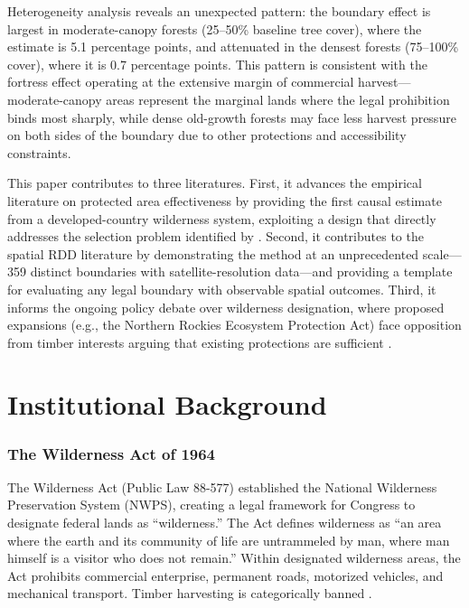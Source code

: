 \documentclass[12pt]{article}
\begin{document}
Heterogeneity analysis reveals an unexpected pattern: the boundary effect is largest in moderate-canopy forests (25--50\% baseline tree cover), where the estimate is 5.1 percentage points, and attenuated in the densest forests (75--100\% cover), where it is 0.7 percentage points. This pattern is consistent with the fortress effect operating at the extensive margin of commercial harvest---moderate-canopy areas represent the marginal lands where the legal prohibition binds most sharply, while dense old-growth forests may face less harvest pressure on both sides of the boundary due to other protections and accessibility constraints.

This paper contributes to three literatures. First, it advances the empirical literature on protected area effectiveness by providing the first causal estimate from a developed-country wilderness system, exploiting a design that directly addresses the selection problem identified by \citet{JoppaAndPfaff2009}. Second, it contributes to the spatial RDD literature \citep{KeeleAndTitiunik2015, Dell2010} by demonstrating the method at an unprecedented scale---359 distinct boundaries with satellite-resolution data---and providing a template for evaluating any legal boundary with observable spatial outcomes. Third, it informs the ongoing policy debate over wilderness designation, where proposed expansions (e.g., the Northern Rockies Ecosystem Protection Act) face opposition from timber interests arguing that existing protections are sufficient \citep{Gorte2011}.


\section{Institutional Background}

\subsubsection*{The Wilderness Act of 1964} The Wilderness Act (Public Law 88-577) established the National Wilderness Preservation System (NWPS), creating a legal framework for Congress to designate federal lands as ``wilderness.'' The Act defines wilderness as ``an area where the earth and its community of life are untrammeled by man, where man himself is a visitor who does not remain.'' Within designated wilderness areas, the Act prohibits commercial enterprise, permanent roads, motorized vehicles, and mechanical transport. Timber harvesting is categorically banned \citep{ScottSuffrinfenAndAgrawal2001}.
\end{document}
